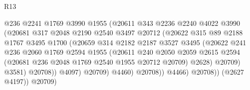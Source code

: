 \begin{lexlean}{R13}
\begin{coremodule}
                                  @236
                                  @2241
                                  @1769
                                  @3990
                                  @1955
                                  (@20611
                                    @343
                                    @2236
                                    @2240
                                    @4022
                                    @3990
                                    (@20681
                                      @317
                                      @2048
                                      @2190
                                      @2540
                                      @3497
                                      @20712
                                      (@20622
                                        @315
                                        @89
                                        @2188
                                        @1767
                                        @3495
                                        @1700
                                        (@20659
                                          @314
                                          @2182
                                          @2187
                                          @3527
                                          @3495
                                          (@20622
                                            @241
                                            @236
                                            @2060
                                            @1769
                                            @2594
                                            @1955
                                            (@20611
                                              @240
                                              @2050
                                              @2059
                                              @2615
                                              @2594
                                              (@20681 @236 @2048 @1769 @2540 @1955 @20712 @20709)
                                              @2628)
                                            @20709)
                                          @3581)
                                        @20708))
                                    @4097)
                                  @20709)
                                @4460)
                              @20708))
                          @4466)
                        @20708))
                    (@2627 @4197))
                  @20709)

\end{coremodule}
\end{lexlean}

